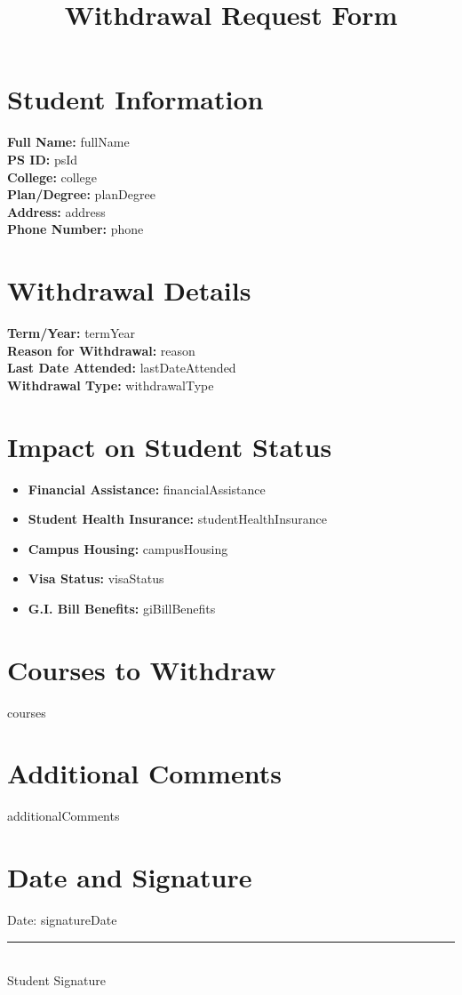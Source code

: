 \documentclass[12pt]{article}
\title{\textbf{Withdrawal Request Form}}
\author{}
\date{}
\begin{document}
\maketitle

\section*{Student Information}
\textbf{Full Name:} {{fullName}} \\[0.5em]
\textbf{PS ID:} {{psId}} \\[0.5em]
\textbf{College:} {{college}} \\[0.5em]
\textbf{Plan/Degree:} {{planDegree}} \\[0.5em]
\textbf{Address:} {{address}} \\[0.5em]
\textbf{Phone Number:} {{phone}} \\[0.5em]

\section*{Withdrawal Details}
\textbf{Term/Year:} {{termYear}} \\[0.5em]
\textbf{Reason for Withdrawal:} {{reason}} \\[0.5em]
\textbf{Last Date Attended:} {{lastDateAttended}} \\[0.5em]
\textbf{Withdrawal Type:} {{withdrawalType}} \\[0.5em]

\section*{Impact on Student Status}
\begin{itemize}[leftmargin=*]
    \item \textbf{Financial Assistance:} {{financialAssistance}}
    \item \textbf{Student Health Insurance:} {{studentHealthInsurance}}
    \item \textbf{Campus Housing:} {{campusHousing}}
    \item \textbf{Visa Status:} {{visaStatus}}
    \item \textbf{G.I. Bill Benefits:} {{giBillBenefits}}
\end{itemize}

\section*{Courses to Withdraw}
{{courses}}

\section*{Additional Comments}
{{additionalComments}}

\vspace{2em}
\section*{Date and Signature}
Date: {{signatureDate}} \\[2em]
\rule{6cm}{0.4pt} \\
Student Signature
\end{document}
